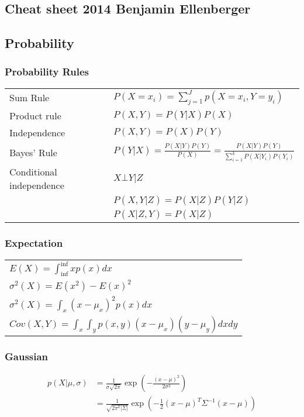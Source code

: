 \documentclass[main]{subfiles}
\begin{document}
\begin{landscape}
\ifx\cheatsheet\undefined
{}
\else
{\color{sectionColor}\section{Cheat sheet 2014 Benjamin Ellenberger}}
\fi

%
%
\begin{multicols}{4}
\scriptsize
{\color{subsectionColor}\subsection{Probability}}
{\color{subsubsectionColor}\subsubsection{Probability Rules}}
\begin{tabular}{p{5em}l}
Sum Rule& \(P(X=x_i) = \sum_{j=1}^{J} p(X=x_i,Y=y_i)\)\\
Product rule& \(P(X, Y) = P(Y|X) P(X)\) \\
Independence& \(P(X, Y) = P(X)P(Y)\) \\
Bayes' Rule& \(P(Y|X) = \frac{P(X|Y)P(Y)}{P(X)} =  \frac{P(X|Y)P(Y)}{\sum\limits^k_{i=1}P(X|Y_i)P(Y_i)}\)\\
Conditional independence& \(X\bot Y|Z \)\\
 & \(P(X,Y|Z) = P(X|Z)P(Y|Z)\) \\
 & \(P(X|Z,Y) = P(X|Z)\)
\end{tabular}
{\color{subsubsectionColor}\subsubsection{Expectation}}
\begin{tabular}{l}
\(E(X) = \int_{\inf}^{\inf} x p(x) dx\) \\
\(\sigma^2(X) = E(x^2)-{E(x)}^2\) \\
\(\sigma^2(X) = \int_x (x-\mu_x)^2 p(x) dx\) \\
\(Cov(X, Y) = \int_x \int_y p(x,y) (x-\mu_x)(y-\mu_y) dx dy\)
\end{tabular}

{\color{subsubsectionColor}\subsubsection{Gaussian}}
\begin{align}
p(X|\mu,\sigma)&=\frac{1}{\sigma \sqrt{2\pi}} \exp(-\frac{(x-\mu)^2}{2\sigma^2})\\
&=\frac{1}{\sqrt{2\pi^k |\Sigma|}} \exp(-\frac{1}{2}(x-\mu)^T\Sigma^{-1}(x-\mu))
\end{align}


\end{multicols}
\end{landscape}
\end{document}
